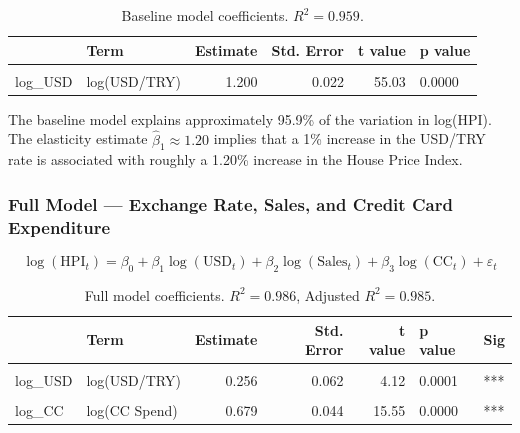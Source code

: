 \documentclass[
  11pt,
  a4paper,
]{article}
\begin{document}
\begin{longtable}[t]{llrrrl}

\caption{\label{tbl-model-baseline}Baseline model coefficients.
\(R^2 = 0.959\).}

\tabularnewline

\toprule
 & Term & Estimate & Std. Error & t value & p value\\
\midrule
\cellcolor{gray!10}{(Intercept)} & \cellcolor{gray!10}{Intercept} & \cellcolor{gray!10}{0.644} & \cellcolor{gray!10}{0.052} & \cellcolor{gray!10}{12.49} & \cellcolor{gray!10}{0.0000}\\
log\_USD & log(USD/TRY) & 1.200 & 0.022 & 55.03 & 0.0000\\
\bottomrule

\end{longtable}

\endgroup{}

The baseline model explains approximately 95.9\% of the variation in
log(HPI). The elasticity estimate \(\hat{\beta}_1 \approx 1.20\) implies
that a 1\% increase in the USD/TRY rate is associated with roughly a
1.20\% increase in the House Price Index.

\subsubsection{Full Model --- Exchange Rate, Sales, and Credit Card
Expenditure}\label{full-model-exchange-rate-sales-and-credit-card-expenditure}

\[
\log(\text{HPI}_t) = \beta_0 + \beta_1 \log(\text{USD}_t) + \beta_2 \log(\text{Sales}_t) + \beta_3 \log(\text{CC}_t) + \varepsilon_t
\]

\begingroup\fontsize{9}{11}\selectfont

\begin{longtable}[t]{llrrrll}

\caption{\label{tbl-model-full}Full model coefficients. \(R^2 = 0.986\),
Adjusted \(R^2 = 0.985\).}

\tabularnewline

\toprule
 & Term & Estimate & Std. Error & t value & p value & Sig\\
\midrule
\cellcolor{gray!10}{(Intercept)} & \cellcolor{gray!10}{Intercept} & \cellcolor{gray!10}{-8.956} & \cellcolor{gray!10}{0.820} & \cellcolor{gray!10}{-10.92} & \cellcolor{gray!10}{0.0000} & \cellcolor{gray!10}{***}\\
log\_USD & log(USD/TRY) & 0.256 & 0.062 & 4.12 & 0.0001 & ***\\
\cellcolor{gray!10}{log\_Sales} & \cellcolor{gray!10}{log(Sales)} & \cellcolor{gray!10}{-0.120} & \cellcolor{gray!10}{0.045} & \cellcolor{gray!10}{-2.68} & \cellcolor{gray!10}{0.0084} & \cellcolor{gray!10}{**}\\
log\_CC & log(CC Spend) & 0.679 & 0.044 & 15.55 & 0.0000 & ***\\
\bottomrule

\end{longtable}
\end{document}
